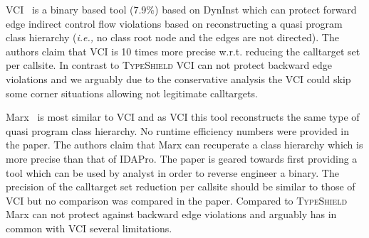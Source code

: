 
VCI~\cite{vci:asiaccs} is a binary based tool (7.9\%) based on DynInst which can protect forward edge indirect control flow violations based 
on reconstructing a quasi program class hierarchy (\textit{i.e.,} no class root node and the edges are not directed). The authors claim that 
VCI is 10 times more precise w.r.t. reducing the calltarget set per callsite. In contrast to \textsc{TypeShield} VCI can not 
protect backward edge violations and we arguably due to the conservative analysis the VCI could skip some corner situations 
allowing not legitimate calltargets.

Marx~\cite{marx} is most similar to VCI and as VCI this tool reconstructs the same type of quasi program class hierarchy. 
No runtime efficiency numbers were provided in the paper.
The authors claim that Marx can recuperate a class hierarchy which is more precise than that of IDAPro. The paper is geared towards
first providing a tool which can be used by analyst in order to reverse engineer a binary. The precision of the calltarget set reduction
per callsite should be similar to those of VCI but no comparison was compared in the paper. Compared to \textsc{TypeShield} 
Marx can not protect against backward edge violations and arguably has in common with VCI several limitations.


